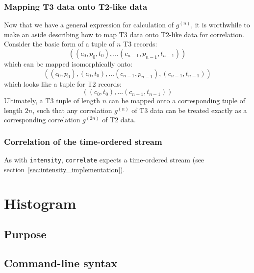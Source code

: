 \documentclass{article}
\newcommand{\intensity}{\texttt{intensity}}
\newcommand{\correlate}{\texttt{correlate}}
\newcommand{\gn}[1]{\ensuremath{g^{(#1)}}}
\begin{document}
\subsubsection{Mapping T3 data onto T2-like data}
Now that we have a general expression for calculation of \gn{n}, it is worthwhile to make an aside describing how to map T3 data onto T2-like data for correlation. Consider the basic form of a tuple of $n$ T3 records:
\begin{equation}
\left((c_{0}, p_{0}, t_{0}), \ldots (c_{n-1}, p_{n-1}, t_{n-1})\right)
\end{equation}
which can be mapped isomorphically onto:
\begin{equation}
\left((c_{0}, p_{0}), (c_{0}, t_{0}), \ldots (c_{n-1}, p_{n-1}), (c_{n-1}, t_{n-1})\right)
\end{equation}
which looks like a tuple for T2 records:
\begin{equation}
\left((c_{0}, t_{0}), \ldots (c_{n-1}, t_{n-1})\right)
\end{equation}
Ultimately, a T3 tuple of length $n$ can be mapped onto a corresponding tuple of length $2n$, such that any correlation \gn{n} of T3 data can be treated exactly as a corresponding correlation \gn{2n} of T2 data.

\subsubsection{Correlation of the time-ordered stream}
As with \intensity, \correlate{} expects a time-ordered stream (see section~\ref{sec:intensity_implementation}). 





\section{Histogram}

\subsection{Purpose}
\subsection{Command-line syntax}
\begin{verbatim}
\end{verbatim}
\end{document}
